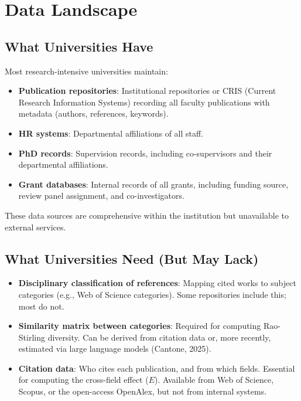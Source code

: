 \documentclass[
]{article}
\providecommand{\tightlist}{%
  \setlength{\itemsep}{0pt}\setlength{\parskip}{0pt}}
\begin{document}
\hypertarget{data-landscape}{%
\section{Data Landscape}\label{data-landscape}}

\hypertarget{what-universities-have}{%
\subsection{What Universities Have}\label{what-universities-have}}

Most research-intensive universities maintain:

\begin{itemize}
\tightlist
\item
  \textbf{Publication repositories}: Institutional repositories or CRIS
  (Current Research Information Systems) recording all faculty
  publications with metadata (authors, references, keywords).
\item
  \textbf{HR systems}: Departmental affiliations of all staff.
\item
  \textbf{PhD records}: Supervision records, including co-supervisors
  and their departmental affiliations.
\item
  \textbf{Grant databases}: Internal records of all grants, including
  funding source, review panel assignment, and co-investigators.
\end{itemize}

These data sources are comprehensive within the institution but
unavailable to external services.

\hypertarget{what-universities-need-but-may-lack}{%
\subsection{What Universities Need (But May
Lack)}\label{what-universities-need-but-may-lack}}

\begin{itemize}
\tightlist
\item
  \textbf{Disciplinary classification of references}: Mapping cited
  works to subject categories (e.g., Web of Science categories). Some
  repositories include this; most do not.
\item
  \textbf{Similarity matrix between categories}: Required for computing
  Rao-Stirling diversity. Can be derived from citation data or, more
  recently, estimated via large language models (Cantone, 2025).
\item
  \textbf{Citation data}: Who cites each publication, and from which
  fields. Essential for computing the cross-field effect (\(E\)).
  Available from Web of Science, Scopus, or the open-access OpenAlex,
  but not from internal systems.
\end{itemize}
\end{document}
